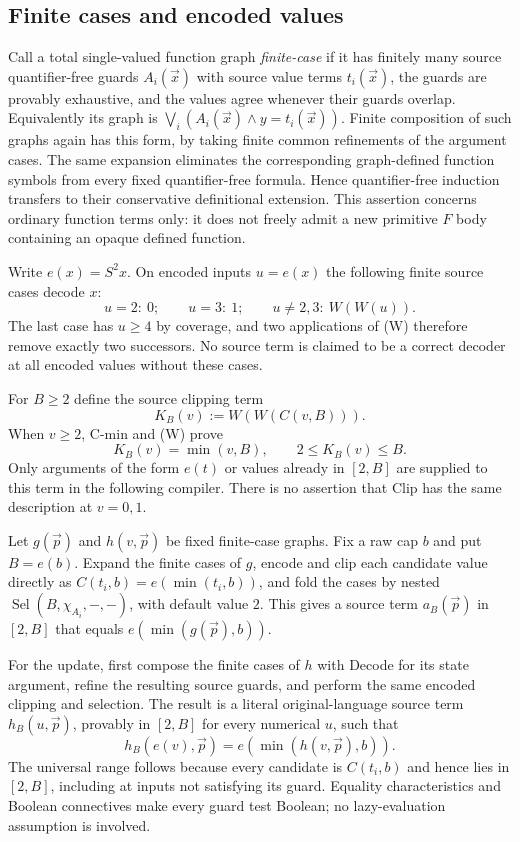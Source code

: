 \subsection{Finite cases and encoded values}
Call a total single-valued function graph \emph{finite-case} if it has
finitely many source quantifier-free guards $A_i(\vec x)$ with source
value terms $t_i(\vec x)$, the guards are provably exhaustive, and
the values agree whenever their guards overlap. Equivalently its
graph is $\bigvee_i(A_i(\vec x)\wedge y=t_i(\vec x))$.
Finite composition of such graphs again has this form, by taking
finite common refinements of the argument cases. The same expansion
eliminates the corresponding graph-defined function symbols from
every fixed quantifier-free formula. Hence quantifier-free induction
transfers to their conservative definitional extension. This assertion
concerns ordinary function terms only: it does not freely admit a
new primitive $F$ body containing an opaque defined function.

Write $e(x)=S^2x$. On encoded inputs $u=e(x)$ the following finite
source cases decode $x$:
\[
 u=2:\ 0;\qquad u=3:\ 1;\qquad u\ne2,3:\ W(W(u)).
 \tag{Decode}
\]
The last case has $u\ge4$ by coverage, and two applications of (W)
therefore remove exactly two successors. No source term is claimed
to be a correct decoder at all encoded values without these cases.

For $B\ge2$ define the source clipping term
\[
                    K_B(v):=W(W(C(v,B))).
\]
When $v\ge2$, C-min and (W) prove
\[
             K_B(v)=\min(v,B),\qquad 2\le K_B(v)\le B.
 \tag{Clip}
\]
Only arguments of the form $e(t)$ or values already in $[2,B]$
are supplied to this term in the following compiler. There is no
assertion that Clip has the same description at $v=0,1$.

Let $g(\vec p)$ and $h(v,\vec p)$ be fixed finite-case graphs. Fix a
raw cap $b$ and put $B=e(b)$. Expand the finite cases of $g$, encode
and clip each candidate value directly as $C(t_i,b)=e(\min(t_i,b))$, and fold the
cases by nested $\operatorname{Sel}(B,\chi_{A_i},-, -)$, with
default value $2$. This gives a source term $a_B(\vec p)$ in $[2,B]$
that equals $e(\min(g(\vec p),b))$.

For the update, first compose the finite cases of $h$ with Decode
for its state argument, refine the resulting source guards, and
perform the same encoded clipping and selection. The result is a
literal original-language source term $h_B(u,\vec p)$, provably
in $[2,B]$ for every numerical $u$, such that
\[
 h_B(e(v),\vec p)=e(\min(h(v,\vec p),b)).
 \tag{Compiled update}
\]
The universal range follows because every candidate is $C(t_i,b)$
and hence lies in $[2,B]$, including at inputs not satisfying its
guard. Equality characteristics and Boolean connectives make every
guard test Boolean; no lazy-evaluation assumption is involved.

